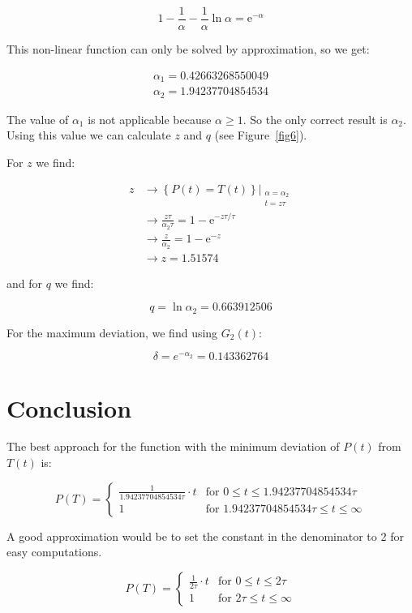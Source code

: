 \documentclass[12pt]{article}
\def\me{\mathrm{e}}
\begin{document}
\begin{equation}
1 - \frac{1}{\alpha} - \frac{1}{\alpha}\ln\alpha = \me^{-\alpha}
\end{equation}

This non-linear function can only be solved by approximation, so we get:

\begin{equation}
\begin{split}
\alpha_1 = 0.42663268550049 \\
\alpha_2 = 1.94237704854534
\end{split}
\end{equation}

The value of $\alpha_1$ is not applicable because $\alpha\geq1$. So the only correct result is $\alpha_2$. Using this value we can calculate $z$ and $q$ (see Figure~\ref{fig6}).

For $z$ we find:

\begin{equation}
\begin{split}
z &\longrightarrow \left\{P(t) = T(t)\right\}\big|_{\substack{\alpha=\alpha_2 \\ t=z\tau}} \\
  &\longrightarrow \frac{z\tau}{\alpha_2\tau} = 1 - \me^{-z\tau/\tau}\\
  &\longrightarrow \frac{z}{\alpha_2} = 1 - \me^{-z} \\
  &\longrightarrow z = 1.51574
\end{split}
\end{equation}

and for $q$ we find:

\begin{equation}
q = \ln\alpha_2 = 0.663912506
\end{equation}

For the maximum deviation, we find using $G_2(t)$:

\begin{equation}
\delta = e^{-\alpha_2} = 0.143362764
\end{equation}

\section{Conclusion}

The best approach for the function with the minimum deviation of $P(t)$ from $T(t)$ is:

\begin{equation}
P(T) = \begin{cases}
\frac{1}{1.94237704854534\tau}\cdot t & \text{for } 0 \leq t \leq 1.94237704854534\tau \\
1 & \text{for } 1.94237704854534\tau \leq t \leq \infty
\end{cases}
\end{equation}

A good approximation would be to set the constant in the denominator to 2 for easy computations.

\begin{equation}
P(T) = \begin{cases}
\frac{1}{2\tau}\cdot t & \text{for } 0 \leq t \leq 2\tau \\
1 & \text{for } 2\tau \leq t \leq \infty
\end{cases}
\end{equation}
\end{document}
